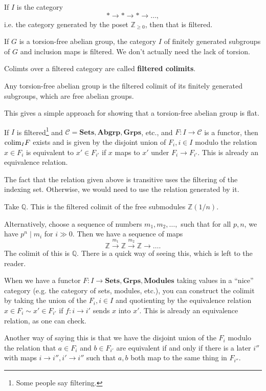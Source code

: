 \begin{example}
If $I$ is the category
\[ \ast \to \ast \to \ast \to \dots,  \]
i.e. the category generated by the poset $\mathbb{Z}_{\geq 0}$, then that is
filtered.
\end{example}


\begin{example}
If $G$ is a torsion-free abelian group, the category $I$ of finitely generated
subgroups of $G$ and inclusion maps is filtered. We don't actually need the
lack of torsion.
\end{example}

\begin{definition}
Colimts over a filtered category are called \textbf{filtered colimits}.
\end{definition}

\begin{example}
Any torsion-free abelian group is the filtered colimit of its finitely
generated subgroups, which are free abelian groups.
\end{example}
This gives a simple approach for showing that a torsion-free abelian group is
flat.

\begin{proposition}
If $I$ is filtered\footnote{Some people say filtering.} and $\mathcal{C} =
\mathbf{Sets}, \mathbf{Abgrp}, \mathbf{Grps}$, etc., and $F: I \to \mathcal{C}$
is a functor, then $\mathrm{colim}_I F$ exists and is given by the disjoint union of
$F_i, i \in I$ modulo the relation $x \in F_i$ is equivalent to $x' \in F_{i'}$
if $x$ maps to $x'$ under $F_i \to F_{i'}$. This is already an equivalence
relation.
\end{proposition}

The fact that the relation given above is transitive uses the filtering of the
indexing set. Otherwise, we would need to use the relation generated by it.

\begin{example}
Take $\mathbb{Q}$. This is the filtered colimit of the free submodules
$\mathbb{Z}(1/n)$.

Alternatively, choose a sequence of numbers $m_1 , m_2, \dots, $ such that for
all $p, n$, we have $p^n \mid m_i$ for $i \gg 0$. Then we have a sequence of
maps
\[ \mathbb{Z} \stackrel{m_1}{\to} \mathbb{Z} \stackrel{m_2}{\to}\mathbb{Z}
\to \dots.   \]
The colimit of this is $\mathbb{Q}$. There is a quick way of seeing this, which
is left to the reader.
\end{example}

When we have a functor $F: I \to \mathbf{Sets}, \mathbf{Grps},
\mathbf{Modules}$ taking values in a ``nice'' category (e.g. the category of
sets, modules, etc.), you can construct the colimit by taking the union of the
$F_i, i \in I$ and quotienting by the equivalence relation $x \in F_i \sim x'
\in F_{i'}$ if $f: i \to i'$ sends $x$ into $x'$. This is already an
equivalence relation, as one can check.

Another way of saying this is that we have the disjoint union of the $F_i$
modulo the relation that $a \in F_i$ and $b \in F_{i'}$ are equivalent if and
only if there is a later $i''$ with maps $i \to i'', i' \to i''$ such that
$a,b$ both map to the same thing in $F_{i''}$.



